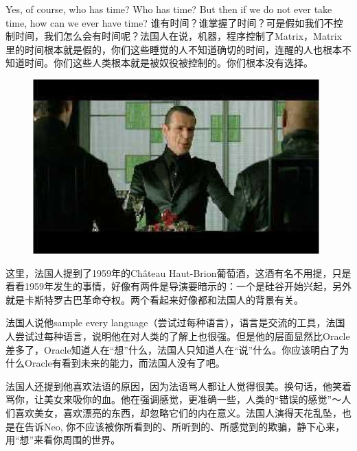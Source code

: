 \documentclass{ctexart}
\begin{document}
Yes, of course, who has time? Who has time? But then if we do not ever take time, how can we ever have time? 谁有时间？谁掌握了时间？可是假如我们不控制时间，我们怎么会有时间呢？法国人在说，机器，程序控制了Matrix，Matrix里的时间根本就是假的，你们这些睡觉的人不知道确切的时间，连醒的人也根本不知道时间。你们这些人类根本就是被奴役被控制的。你们根本没有选择。

\begin{figure}[htb]
\centering
\includegraphics[width=0.5\linewidth]{fig/read_reloaded-93}
\end{figure}

这里，法国人提到了1959年的Château Haut-Brion葡萄酒，这酒有名不用提，只是看看1959年发生的事情，好像有两件是导演要暗示的：一个是硅谷开始兴起，另外就是卡斯特罗古巴革命夺权。两个看起来好像都和法国人的背景有关。

法国人说他sample every language（尝试过每种语言），语言是交流的工具，法国人尝试过每种语言，说明他在对人类的了解上也很强。但是他的层面显然比Oracle差多了，Oracle知道人在“想”什么，法国人只知道人在“说”什么。你应该明白了为什么Oracle有看到未来的能力，而法国人没有了吧。

法国人还提到他喜欢法语的原因，因为法语骂人都让人觉得很美。换句话，他笑着骂你，让美女来吸你的血。他在强调感觉，更准确一些，人类的“错误的感觉”～人们喜欢美女，喜欢漂亮的东西，却忽略它们的内在意义。法国人演得天花乱坠，也是在告诉Neo, 你不应该被你所看到的、所听到的、所感觉到的欺骗，静下心来，用“想”来看你周围的世界。
\end{document}
